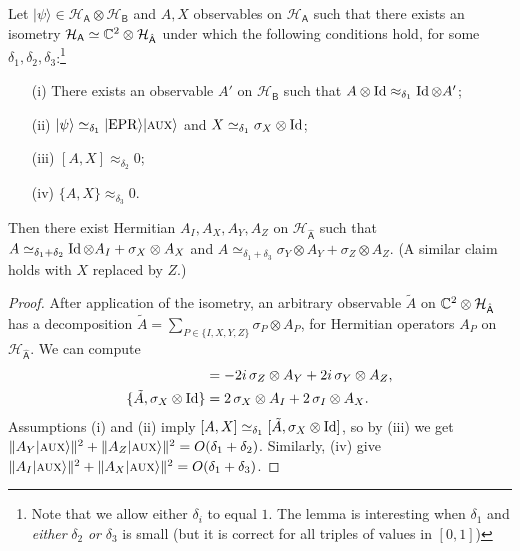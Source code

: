 \documentclass{toc}
\newcommand{\ket}[1]{|#1\rangle}
\newcommand{\Id}{\ensuremath{\mathop{\rm Id}\nolimits}}
\newcommand{\reg}[1]{{\textsf{#1}}}
\newcommand{\mH}{\mathcal{H}}
\newcommand{\EPR}{{\rm EPR}}
\newcommand{\aux}{\textsc {aux}}
\begin{document}
\begin{lemma}\label{lem:pauli-c}
Let $\ket{\psi} \in \mH_{\reg{A}} \otimes \mH_{\reg{B}}$ and $A,X$ observables on $\mH_{\reg{A}}$ such that there exists an isometry $\mH_{\reg{A}} \simeq \C^2 \otimes \mH_{\hat{\reg{A}}}$ under which the following conditions hold, for some $\delta_1,\delta_2,\delta_3$:\footnote{Note that we allow either $\delta_i$ to equal $1$. The lemma is interesting when $\delta_1$ and \emph{either} $\delta_2$ \emph{or} $\delta_3$ is small (but it is correct for all triples of values in $[0,1]$)}
\begin{enumerate}
\item[(i)] There exists an observable $A'$ on $\mH_\reg{B}$ such that $A\otimes \Id \approx_{\delta_1} \Id \otimes A'$;
\item[(ii)] $\ket{\psi} \simeq_{\delta_1} \ket{\EPR}\ket{\aux}$ and $X\simeq_{\delta_1} \sigma_X \otimes \Id$; 
\item[(iii)] $[A,X]\approx_{\delta_2} 0$;
\item[(iv)] $\{A,X\} \approx_{\delta_3} 0$.
\end{enumerate}

Then there exist Hermitian $A_I,A_X,A_Y,A_Z$ on $\mH_{\hat{\reg{A}}}$ such that $A \simeq_{\delta_1+\delta_2} \Id \otimes A_I + \sigma_X \otimes A_X$ and $A \simeq_{\delta_1 + \delta_3} \sigma_Y \otimes A_Y + \sigma_Z \otimes A_Z$. (A similar claim holds with $X$ replaced by $Z$.)
\end{lemma}

\begin{proof}
After application of the isometry, an arbitrary observable $\tilde{A}$ on  $\C^2 \otimes \mH_{\hat{\reg{A}}}$ has a decomposition $\tilde{A} = \sum_{P\in\{I,X,Y,Z\}} \sigma_P \otimes A_P$, for Hermitian operators $A_P$ on $\mH_{\hat{\reg{A}}}$. We can compute
\begin{align}
[\tilde{A},\sigma_X\otimes \Id] &= -2i\,\sigma_Z \otimes A_Y + 2i\,\sigma_Y \otimes A_Z,\label{eq:pauli-c-1}\\
\{\tilde{A},\sigma_X\otimes \Id\} &= 2\,\sigma_X \otimes A_I + 2 \,\sigma_I \otimes A_X.\label{eq:pauli-c-2}
\end{align} 
Assumptions (i) and (ii) imply $[A,X] \simeq_{\delta_1} [\tilde{A},\sigma_X \otimes \Id]$, so by (iii)  we get $\| A_Y \ket{\aux}\|^2 + \|A_Z \ket{\aux}\|^2 = O(\delta_1+\delta_2)$. Similarly, (iv)  give $\| A_I \ket{\aux}\|^2 + \|A_X \ket{\aux}\|^2 = O(\delta_1+\delta_3)$.
\end{proof}
\end{document}
